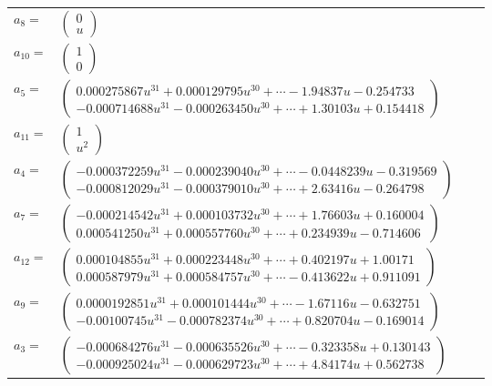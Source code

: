\documentclass[1p]{elsarticle_modified}
\theoremstyle{definition}
\begin{document}
\begin{tabular}{m{7pt} m{180pt} m{7pt} m{180pt} }
\flushright $a_{8}=$&$\begin{pmatrix}0\\u\end{pmatrix}$ \\
\flushright $a_{10}=$&$\begin{pmatrix}1\\0\end{pmatrix}$ \\
\flushright $a_{5}=$&$\begin{pmatrix}0.000275867 u^{31}+0.000129795 u^{30}+\cdots-1.94837 u-0.254733\\-0.000714688 u^{31}-0.000263450 u^{30}+\cdots+1.30103 u+0.154418\end{pmatrix}$ \\
\flushright $a_{11}=$&$\begin{pmatrix}1\\u^2\end{pmatrix}$ \\
\flushright $a_{4}=$&$\begin{pmatrix}-0.000372259 u^{31}-0.000239040 u^{30}+\cdots-0.0448239 u-0.319569\\-0.000812029 u^{31}-0.000379010 u^{30}+\cdots+2.63416 u-0.264798\end{pmatrix}$ \\
\flushright $a_{7}=$&$\begin{pmatrix}-0.000214542 u^{31}+0.000103732 u^{30}+\cdots+1.76603 u+0.160004\\0.000541250 u^{31}+0.000557760 u^{30}+\cdots+0.234939 u-0.714606\end{pmatrix}$ \\
\flushright $a_{12}=$&$\begin{pmatrix}0.000104855 u^{31}+0.000223448 u^{30}+\cdots+0.402197 u+1.00171\\0.000587979 u^{31}+0.000584757 u^{30}+\cdots-0.413622 u+0.911091\end{pmatrix}$ \\
\flushright $a_{9}=$&$\begin{pmatrix}0.0000192851 u^{31}+0.000101444 u^{30}+\cdots-1.67116 u-0.632751\\-0.00100745 u^{31}-0.000782374 u^{30}+\cdots+0.820704 u-0.169014\end{pmatrix}$ \\
\flushright $a_{3}=$&$\begin{pmatrix}-0.000684276 u^{31}-0.000635526 u^{30}+\cdots-0.323358 u+0.130143\\-0.000925024 u^{31}-0.000629723 u^{30}+\cdots+4.84174 u+0.562738\end{pmatrix}$ \\

\end{tabular}
\end{document}
